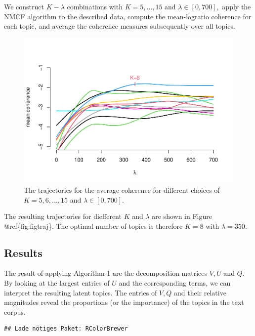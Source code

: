\documentclass[
]{article}
\begin{document}
We construct \(K-\lambda\) combinations with \(K=5,\ldots,15\) and \(\lambda\in[0,700],\) apply the NMCF algorithm to the described data, compute the mean-logratio coherence for each topic, and average the coherence measures subsequently over all topics.

\begin{figure}
\centering
\includegraphics{20210219_sustain_dim_files/figure-latex/figtraj-1.pdf}
\caption{\label{fig:figtraj}The trajectories for the average coherence for different choices of \(K=5,6,\ldots,15\) and \(\lambda\in [0,700]\).}
\end{figure}

The resulting trajectories for diefferent \(K\) and \(\lambda\) are shown in Figure @ref\{fig:figtraj\}. The optimal number of topics is therefore \(K=8\) with \(\lambda=350.\)

\hypertarget{results}{%
\subsection{Results}\label{results}}

The result of applying Algorithm 1 are the decomposition matrices \(V,U\) and \(Q\). By looking at the largest entries of \(U\) and the corresponding terms, we can interpret the resulting latent topics. The entries of \(V,Q\) and their relative magnitudes reveal the proportions (or the importance) of the topics in the text corpus.

\begin{verbatim}
## Lade nötiges Paket: RColorBrewer
\end{verbatim}
\end{document}
